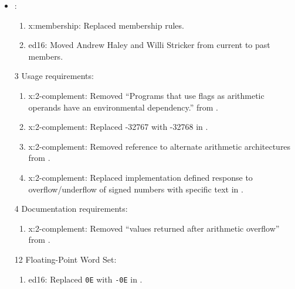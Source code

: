 	\begin{itemize}
	\item {}:						%
		\begin{enumerate}
		\item \textsf{x:membership}: Replaced membership rules.
		\item \textsf{ed16}: Moved Andrew Haley and Willi Stricker from current to past members.
		\end{enumerate}

	\item[3] Usage requirements:					%
	\begin{enumerate}
		\item \textsf{x:2-complement}: Removed ``Programs that use flags as arithmetic operands have an environmental dependency.'' from .
		\item \textsf{x:2-complement}: Replaced -32767 with -32768 in .
		\item \textsf{x:2-complement}: Removed reference to alternate arithmetic  architectures from .
		\item \textsf{x:2-complement}: Replaced implementation defined response to overflow/underflow of signed numbers with specific text in .
	\end{enumerate}

	\item[4] Documentation requirements:			%
		\begin{enumerate}
		\item \textsf{x:2-complement}:
			Removed ``values returned after arithmetic overflow''
			from .
		\end{enumerate}

	\item[12] Floating-Point Word Set:				%
		\begin{enumerate}
		\item \textsf{ed16}: Replaced \texttt{0E} with \texttt{-0E} in  .
		\end{enumerate}


\end{itemize}
